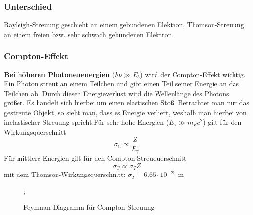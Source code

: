 \documentclass[Ex4_Zusammenfassung.tex]{subfiles}
\begin{document}
\subsubsection{Unterschied} 
Rayleigh-Streuung geschieht an einem gebundenen Elektron, Thomson-Streuung an einem freien bzw. sehr schwach gebundenen Elektron.

\subsubsection{Compton-Effekt}
\textbf{Bei höheren Photonenenergien} ($ h \nu \gg E_b$) wird der Compton-Effekt wichtig. Ein Photon streut an einem Teilchen und gibt einen Teil seiner Energie an das Teilchen ab. Durch diesen Energieverlust wird die Wellenlänge des Photons größer.\newline
Es handelt sich hierbei um einen elastischen Stoß. Betrachtet man nur das gestreute Objekt, so sieht man, dass es Energie verliert, weshalb man hierbei von inelastischer Streuung spricht.Für sehr hohe Energien ($E_{\gamma} \gg m_E c^2$) gilt für den Wirkungsquerschnitt
\begin{equation}
\sigma_{C} \propto \frac{Z}{E_{\gamma}}
\end{equation}
Für mittlere Energien gilt für den Compton-Streuquerschnitt
\begin{equation}
\sigma_{C} \propto \sigma_{T} Z 
\end{equation}
mit dem Thomson-Wirkungsquerschnitt: $\sigma_{T} = 6.65 \cdot 10^{-29} $ m 

\begin{figure}[H]
	\centering
					;
		\caption{Feynman-Diagramm für Compton-Streuung}
	\end{figure}
	
\end{document}
